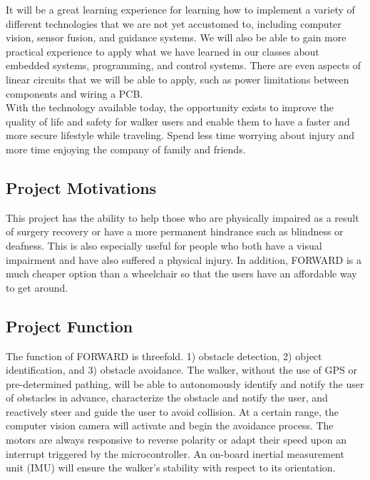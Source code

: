 \noindent It will be a great learning experience for learning how to implement a variety of different technologies that we are not yet accustomed to, including computer vision, sensor fusion, and guidance systems. We will also be able to gain more practical experience to apply what we have learned in our classes about embedded systems, programming, and control systems. There are even aspects of linear circuits that we will be able to apply, such as power limitations between components and wiring a PCB. 
\\

\noindent With the technology available today, the opportunity exists to improve the quality of life and safety for walker users and enable them to have a faster and more secure lifestyle while traveling. Spend less time worrying about injury and more time enjoying the company of family and friends. \\

\subsection{Project Motivations}
\indent This project has the ability to help those who are physically impaired as a result of surgery recovery or have a more permanent hindrance such as blindness or deafness. This is also especially useful for people who both have a visual impairment and have also suffered a physical injury. In addition, FORWARD is a much cheaper option than a wheelchair so that the users have an affordable way to get around. \\


\subsection{Project Function}
\indent The function of FORWARD is threefold. 1) obstacle detection, 2) object identification, and 3) obstacle avoidance. The walker, without the use of GPS or pre-determined pathing, will be able to autonomously identify and notify the user of obstacles in advance, characterize the obstacle and notify the user, and reactively steer and guide the user to avoid collision. At a certain range, the computer vision camera will activate and begin the avoidance process. The motors are always responsive to reverse polarity or adapt their speed upon an interrupt triggered by the microcontroller. An on-board inertial measurement unit (IMU) will ensure the walker’s stability with respect to its orientation.
\\

